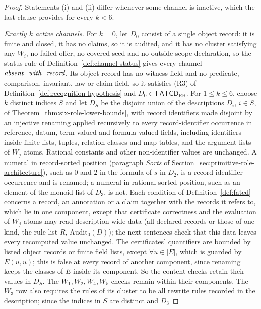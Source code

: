 \documentclass[11pt]{article}
\theoremstyle{definition}
\newcommand{\FATCD}{\ensuremath{\mathsf{FATCD}}}
\newcommand{\absentrec}{\textit{absent\_\allowbreak with\_\allowbreak record}}
\begin{document}
\begin{proof}
Statements (i) and (ii) differ whenever some channel is inactive, which the
last clause provides for every \(k<6\). \par\emph{Exactly \(k\) active channels.} For \(k=0\), let \(D_0\) consist of a
single object record: it is finite and closed, it has no claims, so it is
audited, and it has no cluster satisfying any \(W_i\), no failed offer, no
covered seed and no outside-scope declaration, so the status rule of
Definition~\ref{def:channel-status} gives every channel \(\absentrec\). Its
object record has no witness field and no predicate, comparison, invariant,
law or claim field, so it satisfies (R3) of
Definition~\ref{def:recognition-hypothesis} and
\(D_0\in\FATCD_{\mathrm{RH}}\). For
\(1\le k\le 6\), choose \(k\) distinct indices \(S\) and let \(D_S\) be the
disjoint union of the descriptions \(D_i\), \(i\in S\), of
Theorem~\ref{thm:six-role-lower-bounds}, with record identifiers made
disjoint by an injective renaming applied recursively to every
record-identifier occurrence in reference, datum, term-valued and
formula-valued fields, including identifiers inside finite lists,
tuples, relation classes and map tables, and the argument lists of
\(W_j\) atoms. Rational constants and other non-identifier values
are unchanged. A numeral in record-sorted position (paragraph \emph{Sorts} of Section~\ref{sec:primitive-role-architecture}), such as \(0\) and \(2\) in the formula of \(s\) in \(D_2\), is a record-identifier occurrence and is renamed; a numeral in rational-sorted position, such as an element of the monoid list of \(D_3\), is not. Each condition of Definition~\ref{def:fatcd} concerns a record, an
annotation or a claim together with the records it refers to, which lie in one component, except that certificate correctness and the evaluation of \(W_j\) atoms may read description-wide data (all declared records or those of one kind, the rule list \(R\), \(\mathrm{Audit}_0(D)\)); the next sentences check that this data leaves every recomputed value unchanged. The certificates' quantifiers are bounded by listed object records or finite field lists, except \(\forall u\in|E|\), which is guarded by \(E(u,u)\); this is false at every record of another component, since renaming keeps the classes of \(E\) inside its component. So the content checks retain their values in \(D_S\). The \(W_1,W_2,W_4,W_5\) checks remain within their components. The
\(W_3\) row also requires the rules of its cluster to be all rewrite rules
recorded in the description; since the indices in \(S\) are distinct and \(D_3\)

\end{proof}
\end{document}
